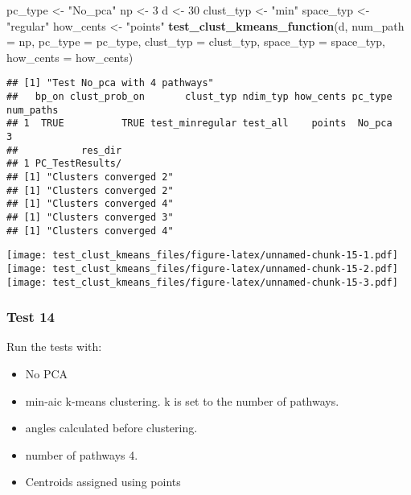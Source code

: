 \documentclass[
]{article}
\newenvironment{Shaded}{\begin{snugshade}}{\end{snugshade}}
\newcommand{\AttributeTok}[1]{\textcolor[rgb]{0.13,0.29,0.53}{#1}}
\newcommand{\DecValTok}[1]{\textcolor[rgb]{0.00,0.00,0.81}{#1}}
\newcommand{\FunctionTok}[1]{\textcolor[rgb]{0.13,0.29,0.53}{\textbf{#1}}}
\newcommand{\NormalTok}[1]{#1}
\newcommand{\OtherTok}[1]{\textcolor[rgb]{0.56,0.35,0.01}{#1}}
\newcommand{\StringTok}[1]{\textcolor[rgb]{0.31,0.60,0.02}{#1}}
\providecommand{\tightlist}{%
  \setlength{\itemsep}{0pt}\setlength{\parskip}{0pt}}
\begin{document}
\begin{Shaded}
\begin{Highlighting}[]
\NormalTok{pc\_type }\OtherTok{\textless{}{-}} \StringTok{"No\_pca"}
\NormalTok{np }\OtherTok{\textless{}{-}} \DecValTok{3}
\NormalTok{d }\OtherTok{\textless{}{-}} \DecValTok{30}
\NormalTok{clust\_typ }\OtherTok{\textless{}{-}} \StringTok{"min"}
\NormalTok{space\_typ }\OtherTok{\textless{}{-}} \StringTok{"regular"}
\NormalTok{how\_cents }\OtherTok{\textless{}{-}} \StringTok{"points"}
\FunctionTok{test\_clust\_kmeans\_function}\NormalTok{(d,}
                           \AttributeTok{num\_path =}\NormalTok{ np,}
                           \AttributeTok{pc\_type =}\NormalTok{ pc\_type,}
                           \AttributeTok{clust\_typ =}\NormalTok{ clust\_typ,}
                           \AttributeTok{space\_typ =}\NormalTok{ space\_typ,}
                           \AttributeTok{how\_cents =}\NormalTok{ how\_cents)}
\end{Highlighting}
\end{Shaded}

\begin{verbatim}
## [1] "Test No_pca with 4 pathways"
##   bp_on clust_prob_on       clust_typ ndim_typ how_cents pc_type num_paths
## 1  TRUE          TRUE test_minregular test_all    points  No_pca         3
##           res_dir
## 1 PC_TestResults/
## [1] "Clusters converged 2"
## [1] "Clusters converged 2"
## [1] "Clusters converged 4"
## [1] "Clusters converged 3"
## [1] "Clusters converged 4"
\end{verbatim}

\texttt{[image: test\_clust\_kmeans\_files/figure-latex/unnamed-chunk-15-1.pdf]}
\texttt{[image: test\_clust\_kmeans\_files/figure-latex/unnamed-chunk-15-2.pdf]}
\texttt{[image: test\_clust\_kmeans\_files/figure-latex/unnamed-chunk-15-3.pdf]}

\hypertarget{test-14}{%
\subsubsection{Test 14}\label{test-14}}

Run the tests with:

\begin{itemize}
\tightlist
\item
  No PCA
\item
  min-aic k-means clustering. k is set to the number of pathways.
\item
  angles calculated before clustering.
\item
  number of pathways 4.
\item
  Centroids assigned using points
\end{itemize}
\end{document}
